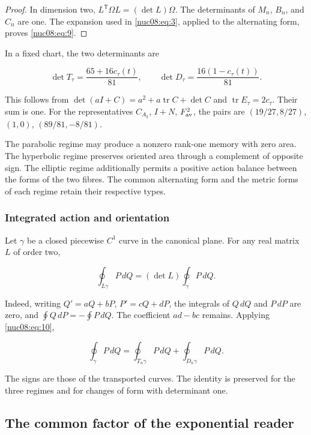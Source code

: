 \begin{proof}
In dimension two, \(L^\mathsf T\Omega L=(\det L)\Omega\). The determinants of \(M_n\), \(B_n\), and \(C_n\) are one. The expansion used in \eqref{nuc08:eq:3}, applied to the alternating form, proves \eqref{nuc08:eq:9}.
\end{proof}

In a fixed chart, the two determinants are

\begin{equation}
\det T_\tau=\frac{65+16c_\tau(t)}{81},\qquad
\det D_\tau=\frac{16(1-c_\tau(t))}{81}.
\label{nuc08:eq:10}
\end{equation}

This follows from \(\det(aI+C)=a^2+a\operatorname{tr}C+\det C\) and \(\operatorname{tr}E_\tau=2c_\tau\). Their sum is one. For the representatives \(C_{A_2}\), \(I+N\), \(F_{\rm av}^2\), the pairs are \((19/27,8/27)\), \((1,0)\), \((89/81,-8/81)\).

The parabolic regime may produce a nonzero rank-one memory with zero area. The hyperbolic regime preserves oriented area through a complement of opposite sign. The elliptic regime additionally permits a positive action balance between the forms of the two fibres. The common alternating form and the metric forms of each regime retain their respective types.

\subsubsection{Integrated action and orientation}

Let \(\gamma\) be a closed piecewise \(C^1\) curve in the canonical plane. For any real matrix \(L\) of order two,

\[
\oint_{L\gamma}P\,dQ=(\det L)\oint_\gamma P\,dQ.
\]

Indeed, writing \(Q'=aQ+bP\), \(P'=cQ+dP\), the integrals of \(Q\,dQ\) and \(P\,dP\) are zero, and \(\oint Q\,dP=-\oint P\,dQ\). The coefficient \(ad-bc\) remains. Applying \eqref{nuc08:eq:10},

\begin{equation}
\boxed{\oint_\gamma P\,dQ
=\oint_{T_n\gamma}P\,dQ+\oint_{D_n\gamma}P\,dQ.}
\label{nuc08:eq:11}
\end{equation}

The signs are those of the transported curves. The identity is preserved for the three regimes and for changes of form with determinant one.

\subsection{The common factor of the exponential reader}

